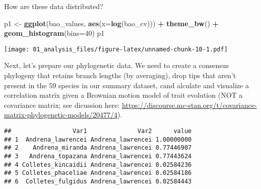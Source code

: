 \documentclass[
]{article}
\newenvironment{Shaded}{\begin{snugshade}}{\end{snugshade}}
\newcommand{\AttributeTok}[1]{\textcolor[rgb]{0.13,0.29,0.53}{#1}}
\newcommand{\ConstantTok}[1]{\textcolor[rgb]{0.56,0.35,0.01}{#1}}
\newcommand{\DecValTok}[1]{\textcolor[rgb]{0.00,0.00,0.81}{#1}}
\newcommand{\FunctionTok}[1]{\textcolor[rgb]{0.13,0.29,0.53}{\textbf{#1}}}
\newcommand{\NormalTok}[1]{#1}
\newcommand{\OtherTok}[1]{\textcolor[rgb]{0.56,0.35,0.01}{#1}}
\newcommand{\SpecialCharTok}[1]{\textcolor[rgb]{0.81,0.36,0.00}{\textbf{#1}}}
\begin{document}
How are these data distributed?

\begin{Shaded}
\begin{Highlighting}[]
\NormalTok{p1 }\OtherTok{\textless{}{-}} \FunctionTok{ggplot}\NormalTok{(bao\_values, }\FunctionTok{aes}\NormalTok{(}\AttributeTok{x=}\FunctionTok{log}\NormalTok{(bao\_cv))) }\SpecialCharTok{+} 
  \FunctionTok{theme\_bw}\NormalTok{() }\SpecialCharTok{+}
  \FunctionTok{geom\_histogram}\NormalTok{(}\AttributeTok{bins=}\DecValTok{40}\NormalTok{)}
\NormalTok{p1}
\end{Highlighting}
\end{Shaded}

\texttt{[image: 01\_analysis\_files/figure-latex/unnamed-chunk-10-1.pdf]}

Next, let's prepare our phylogenetic data. We need to create a consensus
phylogeny that retains branch lengths (by averaging), drop tips that
aren't present in the 59 species in our summary dataset, cand alculate
and visualize a correlation matrix given a Brownian motion model of
trait evolution (NOT a covariance matrix; see dicussion here:
\url{https://discourse.mc-stan.org/t/covariance-matrix-phylogenetic-models/20477/4}).

\begin{Shaded}
\end{Shaded}

\begin{verbatim}
##                 Var1              Var2      value
## 1  Andrena_lawrencei Andrena_lawrencei 1.00000000
## 2    Andrena_miranda Andrena_lawrencei 0.77446907
## 3   Andrena_topazana Andrena_lawrencei 0.77443624
## 4 Colletes_kincaidii Andrena_lawrencei 0.02584236
## 5 Colletes_phaceliae Andrena_lawrencei 0.02584186
## 6  Colletes_fulgidus Andrena_lawrencei 0.02584443
\end{verbatim}
\end{document}
